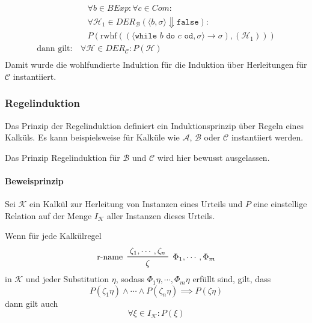 \documentclass[a4paper, 11pt, accentcolor = tud3b]{tudreport}
\begin{document}
\begin{align*}
								&\quad \forall b \in \textit{BExp} : \forall c \in \textit{Com} : \tag{Ausdrucksbestandteile} \\
								&\quad \forall \mathcal{H} _ 1 \in \textit{DER} _ \mathcal{B} (\langle b, \sigma \rangle \Downarrow \texttt{false}) : \tag{Kalkülfremde Herleitungen} \\
								&\quad P(\text{rwhf}((\langle \texttt{while } b \texttt{ do } c \texttt{ od}, \sigma \rangle \rightarrow \sigma), (\mathcal{H} _ 1))) \tag{Konklusion} \\
							\text{dann gilt:} & \,\forall \mathcal{H} \in \textit{DER} _ \mathcal{C} : P(\mathcal{H}) \\
					    \end{align*}
					    Damit wurde die wohlfundierte Induktion für die Induktion über Herleitungen für $ \mathcal{C} $ instantiiert.
				    
				    \subsubsection{Regelinduktion}
					    Das Prinzip der Regelinduktion definiert ein Induktionsprinzip über Regeln eines Kalküls. Es kann beispielsweise für Kalküle wie $ \mathcal{A} $, $ \mathcal{B} $ oder $ \mathcal{C} $ instantiiert werden.
					    
					    Das Prinzip Regelinduktion für $ \mathcal{B} $ und $ \mathcal{C} $ wird hier bewusst ausgelassen.
					    
					    \paragraph{Beweisprinzip}
						    Sei $ \mathcal{K} $ ein Kalkül zur Herleitung von Instanzen eines Urteils und $ P $ eine einstellige Relation auf der Menge $ I _ \mathcal{K} $ aller Instanzen dieses Urteils.
						    
						    Wenn für jede Kalkülregel
						    \begin{equation*}
							    \prftree[l, r]
								    { $ \Phi _ 1, \cdots, \Phi _ m $ }
								    { r-name }
								    { \zeta _ 1, \cdots, \zeta _ n }
								    { \zeta }
						    \end{equation*}
						    in $ \mathcal{K} $ und jeder Substitution $ \eta $, sodass $ \Phi _ 1 \eta, \cdots, \Phi _ m \eta $ erfüllt sind, gilt, dass
						    \begin{equation*}
							    P(\zeta _ 1 \eta) \land \cdots \land P(\zeta _ n \eta) \implies P(\zeta\eta)
						    \end{equation*}
						    dann gilt auch
							\begin{equation*}
								\forall \xi \in I _ \mathcal{K} : P(\xi)
							\end{equation*}
				    
\end{document}
